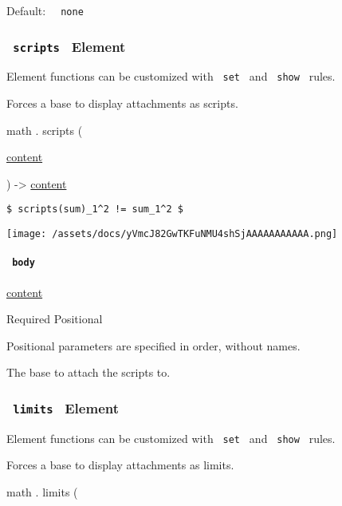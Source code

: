 Default: \texttt{\ }{\texttt{\ none\ }}\texttt{\ }

\subsubsection{\texorpdfstring{\texttt{\ scripts\ } {{ Element
}}}{ scripts   Element }}\label{functions-scripts}

\label{functions-scripts-element-tooltip}
Element functions can be customized with \texttt{\ set\ } and
\texttt{\ show\ } rules.

Forces a base to display attachments as scripts.

math { . } { scripts } (

{ \href{/docs/reference/foundations/content/}{content} }

) -\textgreater{} \href{/docs/reference/foundations/content/}{content}

\begin{verbatim}
$ scripts(sum)_1^2 != sum_1^2 $
\end{verbatim}

\texttt{[image: /assets/docs/yVmcJ82GwTKFuNMU4shSjAAAAAAAAAAA.png]}

\paragraph{\texorpdfstring{\texttt{\ body\ }}{ body }}\label{functions-scripts-body}

\href{/docs/reference/foundations/content/}{content}

{Required} {{ Positional }}

\label{functions-scripts-body-positional-tooltip}
Positional parameters are specified in order, without names.

The base to attach the scripts to.

\subsubsection{\texorpdfstring{\texttt{\ limits\ } {{ Element
}}}{ limits   Element }}\label{functions-limits}

\label{functions-limits-element-tooltip}
Element functions can be customized with \texttt{\ set\ } and
\texttt{\ show\ } rules.

Forces a base to display attachments as limits.

math { . } { limits } (

